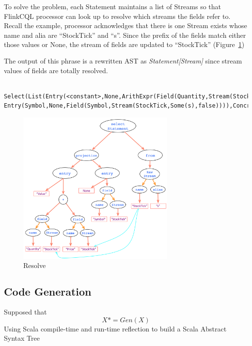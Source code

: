 To solve the problem, each Statement maintains a list of Streams so that FlinkCQL processor can look up to resolve which streams the fields refer to. Recall the example, processor acknowledges that there is one Stream exists whose name and alia are ``StockTick'' and ``s''. Since the prefix of the fields match either those values or None, the stream of fields are updated to ``StockTick'' (Figure~\ref{fig:Resolve})

The output of this phrase is a rewritten AST as \textit{Statement[Stream]} since stream values of  fields are totally resolved.

\begin{lstlisting}
	Select(List(Entry(<constant>,None,ArithExpr(Field(Quantity,Stream(StockTick,Some(s),false)),*,Field(Price,Stream(StockTick,Some(s),false)))), Entry(Symbol,None,Field(Symbol,Stream(StockTick,Some(s),false)))),ConcreteStream(Stream(StockTick,Some(s),false),None,None),None,None)

\end{lstlisting}

\begin{figure}[h!] 
\centering    
\includegraphics[width=0.7\textwidth]{Resolve}
\caption{Resolve}
\label{fig:Resolve}
\end{figure}


\subsection{Code Generation}

Supposed that 
	\begin{equation}
		X* = Gen(X)
	\end{equation}
Using Scala compile-time and run-time reflection to build a Scala Abstract Syntax Tree

